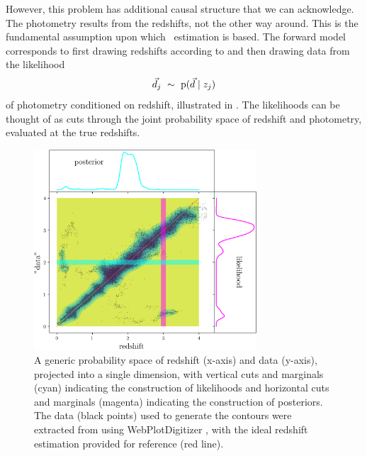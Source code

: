 However, this problem has additional causal structure that we can acknowledge.
The photometry results from the redshifts, not the other way around.
This is the fundamental assumption upon which \pz\ estimation is based.
The forward model corresponds to first drawing redshifts according to  and then drawing data from the likelihood
\begin{equation}
\eqlabel{eqn:pzpdf}
\data_{j}\ \sim\ \pr{\data \gvn z_{j}}
\end{equation}
of photometry conditioned on redshift, illustrated in .
The likelihoods can be thought of as cuts through the joint probability space of redshift and photometry, evaluated at the true redshifts.

\begin{figure}
	\begin{center}
		\includegraphics[width=0.74\textwidth]{figures/chippr/jain05.png}
		\caption{
			A generic probability space of redshift (x-axis) and data (y-axis), projected into a single dimension, with vertical cuts and marginals (cyan) indicating the construction of likelihoods and horizontal cuts and marginals (magenta) indicating the construction of posteriors.
			The data (black points) used to generate the contours were extracted from \citet{jain_whole_2015} using WebPlotDigitizer \citep{rohatgi_webplotdigitizer_2019}, with the ideal redshift estimation provided for reference (red line).
		}
	\end{center}
\end{figure}

